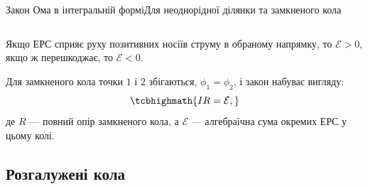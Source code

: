 \documentclass[onlytextwidth]{beamer}
\begin{document}
\begin{frame}{Закон Ома в інтегральній формі}{Для неоднорідної ділянки та замкненого кола}
\begin{overprint}
\begin{equation*}
		\end{equation*}
		\begin{alertblock}{}\justifying\small
			Якщо ЕРС сприяє руху позитивних носіїв струму в обраному напрямку, то $\mathcal{E} > 0$, якщо ж перешкоджає, то  $\mathcal{E} < 0$.
		\end{alertblock}
		\begin{block}{}
			Для замкненого кола точки $1$ і $2$ збігаються, $\phi_1 = \phi_2$, і закон набуває вигляду:
			\begin{equation*}
				\tcbhighmath{I R = \mathcal{E},}
			\end{equation*}
			де $R$ --- повний опір замкненого кола, а $\mathcal{E}$ --- алгебраїчна сума окремих ЕРС у цьому колі.
		\end{block}
	\end{overprint}
\end{frame}



\subsection{Розгалужені кола}
\end{document}
